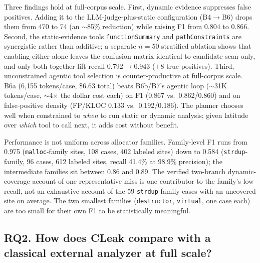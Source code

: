 \documentclass[a4paper]{llncs}
\begin{document}
Three findings hold at full-corpus scale. First, dynamic evidence suppresses false positives. Adding it to the
LLM-judge-plus-static configuration (B4$\to$B6) drops them from 470 to 74 (an $\sim$85\% reduction) while raising F1 from 0.804 to
0.866. Second, the static-evidence tools \texttt{functionSummary} and
\texttt{pathConstraints} are synergistic rather than additive; a
separate $n{=}50$ stratified ablation shows that enabling either alone
leaves the confusion matrix identical to candidate-scan-only, and only
both together lift recall 0.792$\to$0.943 ($+8$ true positives). Third,
unconstrained agentic tool selection is counter-productive at
full-corpus scale. B6a (6{,}155 tokens/case, \$6.63 total) beats
B6b/B7's agentic loop ($\sim$31K tokens/case, $\sim$4$\times$ the
dollar cost each) on F1 (0.867 vs.\ 0.862/0.860) and on false-positive
density (FP/KLOC 0.133 vs.\ 0.192/0.186). The planner chooses well when
constrained to \emph{when} to run static or dynamic analysis; given
latitude over \emph{which} tool to call next, it adds cost without
benefit.

Performance is not uniform across allocator families. Family-level F1
runs from 0.975 (\texttt{malloc}-family sites, 108 cases, 402 labeled
sites) down to 0.584 (\texttt{strdup}-family, 96 cases, 612 labeled
sites, recall 41.4\% at 98.9\% precision); the intermediate families
sit between 0.86 and 0.89. The verified two-branch
dynamic-coverage account of one representative miss is one contributor
to the family's low recall, not an exhaustive account of the 59
\texttt{strdup}-family cases with an uncovered site on average. The two
smallest families (\texttt{destructor},
\texttt{virtual}, one case each) are too small for their own F1 to be
statistically meaningful.

\noindent{}

\subsection{RQ2. How does CLeak compare with a classical external analyzer at full scale?}
\label{sec:eval-external}
\end{document}
